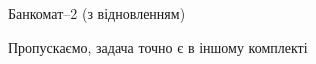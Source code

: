 ﻿\begin{problemAllDefault}{Банкомат--2 (з відновленням)}\label{problem:ATM-restore}

Пропускаємо, задача точно є в іншому комплекті

 
\end{problemAllDefault}